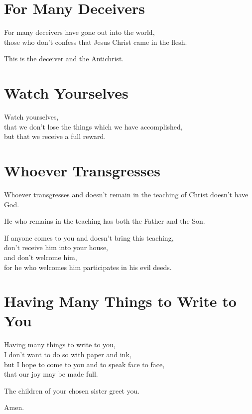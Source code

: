 \newpage\section{For Many Deceivers}

For many deceivers have gone out into the world,
\\
those who don’t confess that Jesus Christ came in the flesh.

This is the deceiver and the Antichrist.

\newpage\section{Watch Yourselves}

Watch yourselves,
\\
that we don’t lose the things which we have accomplished,
\\
but that we receive a full reward.

\newpage\section{Whoever Transgresses}

Whoever transgresses and doesn’t remain in the teaching of Christ doesn’t have God.

He who remains in the teaching has both the Father and the Son.

If anyone comes to you and doesn’t bring this teaching,
\\
don’t receive him into your house,
\\
and don’t welcome him,
\\
for he who welcomes him participates in his evil deeds.

\newpage\section{Having Many Things to Write to You}

Having many things to write to you,
\\
I don’t want to do so with paper and ink,
\\
but I hope to come to you and to speak face to face,
\\
that our joy may be made full.

The children of your chosen sister greet you.

Amen.
